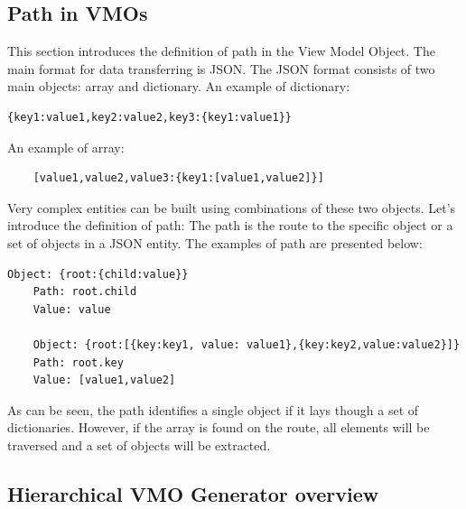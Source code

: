 

\subsection{Path in VMOs}

This section introduces the definition of path in the View Model Object. The main format for data transferring is JSON. The JSON format consists of two main objects: array and dictionary. An example of dictionary:

\lstset{ %
    caption=The example of JSON dictionary,
    basicstyle=\ttfamily\footnotesize\bfseries,
    linewidth=0.6\textwidth
 }
\begin{lstlisting}[linewidth=5cm]
	{key1:value1,key2:value2,key3:{key1:value1}}
\end{lstlisting}

 
An example of array: 

\lstset{ %
    caption=The example of JSON array,
    basicstyle=\ttfamily\footnotesize\bfseries,
    linewidth=0.6\textwidth
 }
\begin{lstlisting}
	[value1,value2,value3:{key1:[value1,value2]}]
\end{lstlisting}

Very complex entities can be built using combinations of these two objects. Let's introduce the definition of path: The path is the route to the specific object or a set of objects in a JSON entity. 
The examples of path are presented below:
\lstset{ %
    caption=The examples of objects in different routes,
    basicstyle=\ttfamily\footnotesize\bfseries,
    linewidth=0.6\textwidth
 }
\begin{lstlisting}[linewidth=5cm]
	Object: {root:{child:value}}
	Path: root.child
	Value: value

	Object: {root:[{key:key1, value: value1},{key:key2,value:value2}]}
	Path: root.key
	Value: [value1,value2]

\end{lstlisting}


As can be seen, the path identifies a single object if it lays though a set of dictionaries. However, if the array is found on the route, all elements will be traversed and a set of objects will be extracted. 


\subsection{Hierarchical VMO Generator overview}

